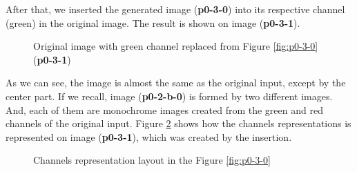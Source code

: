 \documentclass[12pt,a4paper]{article}
\begin{document}
After that, we inserted the generated image (\textbf{p0-3-0}) into its respective channel (green) in the original image. The result is shown on image (\textbf{p0-3-1}).

\begin{figure}[!h]
	\centering
	{%
		\setlength{\fboxsep}{1pt}%
		\setlength{\fboxrule}{1pt}%
	}%
	\caption{Original image with green channel replaced from Figure \ref{fig:p0-3-0} (\textbf{p0-3-1})}
	\label{fig:p0-3-1}
\end{figure}

As we can see, the image is almost the same as the original input, except by the center part. If we recall, image (\textbf{p0-2-b-0}) is formed by two different images. And, each of them are monochrome images created from the green and red channels of the original input. Figure \ref{fig:channels} shows how the channels representations is represented on image (\textbf{p0-3-1}), which was created by the insertion. \\

\begin{figure}[!h]
	\centering
	{%
		\setlength{\fboxsep}{1pt}%
		\setlength{\fboxrule}{1pt}%
	}%
	\caption{Channels representation layout in the Figure \ref{fig:p0-3-0}}
	\label{fig:channels}
\end{figure}
\end{document}

